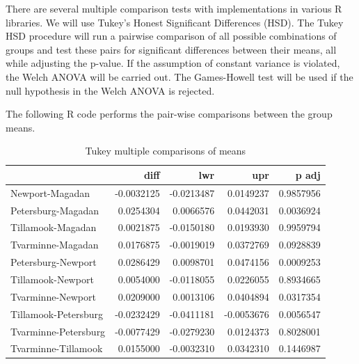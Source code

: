 \documentclass[
]{book}
\newenvironment{Shaded}{\begin{snugshade}}{\end{snugshade}}
\newcommand{\AttributeTok}[1]{\textcolor[rgb]{0.13,0.29,0.53}{#1}}
\newcommand{\FunctionTok}[1]{\textcolor[rgb]{0.13,0.29,0.53}{\textbf{#1}}}
\newcommand{\NormalTok}[1]{#1}
\newcommand{\OtherTok}[1]{\textcolor[rgb]{0.56,0.35,0.01}{#1}}
\newcommand{\SpecialCharTok}[1]{\textcolor[rgb]{0.81,0.36,0.00}{\textbf{#1}}}
\newcommand{\StringTok}[1]{\textcolor[rgb]{0.31,0.60,0.02}{#1}}
\begin{document}
There are several multiple comparison tests with implementations in various R libraries. We will use Tukey's Honest Significant Differences (HSD). The Tukey HSD procedure will run a pairwise comparison of all possible combinations of groups and test these pairs for significant differences between their means, all while adjusting the p-value. If the assumption of constant variance is violated, the Welch ANOVA will be carried out. The Games-Howell test will be used if the null hypothesis in the Welch ANOVA is rejected.

The following R code performs the pair-wise comparisons between the group means.

\begin{Shaded}
\end{Shaded}

\begin{table}

\caption{\label{tab:unnamed-chunk-131}Tukey multiple comparisons of means}
\centering
\begin{tabular}[t]{l|r|r|r|r}
\hline
  & diff & lwr & upr & p adj\\
\hline
Newport-Magadan & -0.0032125 & -0.0213487 & 0.0149237 & 0.9857956\\
\hline
Petersburg-Magadan & 0.0254304 & 0.0066576 & 0.0442031 & 0.0036924\\
\hline
Tillamook-Magadan & 0.0021875 & -0.0150180 & 0.0193930 & 0.9959794\\
\hline
Tvarminne-Magadan & 0.0176875 & -0.0019019 & 0.0372769 & 0.0928839\\
\hline
Petersburg-Newport & 0.0286429 & 0.0098701 & 0.0474156 & 0.0009253\\
\hline
Tillamook-Newport & 0.0054000 & -0.0118055 & 0.0226055 & 0.8934665\\
\hline
Tvarminne-Newport & 0.0209000 & 0.0013106 & 0.0404894 & 0.0317354\\
\hline
Tillamook-Petersburg & -0.0232429 & -0.0411181 & -0.0053676 & 0.0056547\\
\hline
Tvarminne-Petersburg & -0.0077429 & -0.0279230 & 0.0124373 & 0.8028001\\
\hline
Tvarminne-Tillamook & 0.0155000 & -0.0032310 & 0.0342310 & 0.1446987\\
\hline
\end{tabular}
\end{table}
\end{document}
